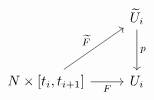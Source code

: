 \documentclass{article}
\begin{document}
    \begin{equation*}
        \begin{tikzcd}[row sep = 0.4in]
            & \widetilde{U}_i \ar[d, "p"] \\
            N\times\l[t_i,t_{i+1}\r] \ar[r, "F"'] \ar[ur, "\widetilde{F}"] & U_i
        \end{tikzcd}
    \end{equation*}
\end{document}
